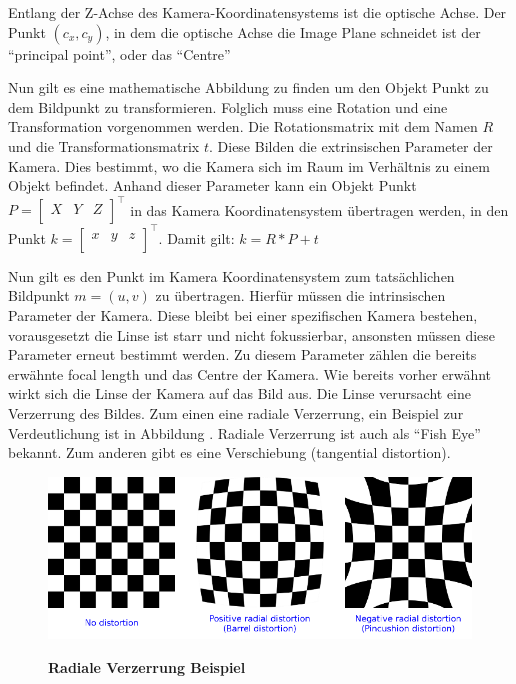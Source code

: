 Entlang der Z-Achse des Kamera-Koordinatensystems ist die optische Achse. Der Punkt $(c_x,c_y)$, in dem die optische Achse die Image Plane schneidet ist der "`principal point"', oder das "`Centre"' \autocite[8]{Medioni:2004:ETC:993884}

Nun gilt es eine mathematische Abbildung zu finden um den Objekt Punkt zu dem Bildpunkt zu transformieren. Folglich muss eine Rotation und eine Transformation vorgenommen werden.
Die Rotationsmatrix mit dem Namen $R$ und die Transformationsmatrix $t$. Diese Bilden die extrinsischen Parameter der Kamera. Dies bestimmt, wo die Kamera sich im Raum im Verhältnis zu einem Objekt befindet. Anhand dieser Parameter kann ein  Objekt Punkt $P = \begin{bmatrix}X & Y& Z \\\end{bmatrix}^\intercal$ in das Kamera Koordinatensystem übertragen werden, in den Punkt $ k = \begin{bmatrix}x & y& z \\\end{bmatrix}^\intercal$. Damit gilt: 
$k = R * P + t$ 

Nun gilt es den Punkt im Kamera Koordinatensystem zum tatsächlichen Bildpunkt $m=(u,v)$ zu übertragen. Hierfür müssen die intrinsischen Parameter der Kamera. Diese bleibt bei einer spezifischen Kamera bestehen, vorausgesetzt die Linse ist starr und nicht fokussierbar, ansonsten müssen diese Parameter erneut bestimmt werden.
Zu diesem Parameter zählen die bereits erwähnte focal length und das Centre der Kamera. Wie bereits vorher erwähnt wirkt sich die Linse der Kamera auf das Bild aus. Die Linse verursacht eine Verzerrung des Bildes. Zum einen eine radiale Verzerrung, ein Beispiel zur Verdeutlichung ist in Abbildung . Radiale Verzerrung ist auch als "`Fish Eye"' bekannt. Zum anderen gibt es eine Verschiebung (tangential distortion). 

\begin{figure}
\includegraphics[width=\textwidth]{media/distortion_examples}\\
\caption{\textbf{Radiale Verzerrung Beispiel \autocite{OpencvCamera2016}}
}
\label{Fig:radialdistortion}
\end{figure}

